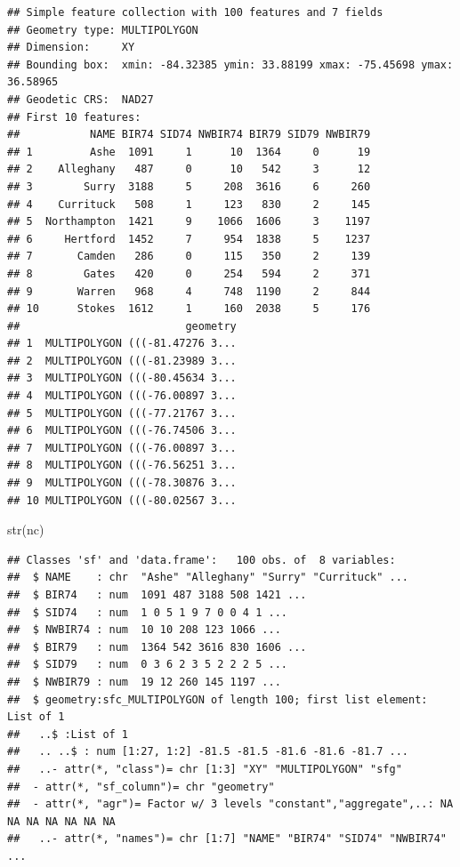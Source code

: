\documentclass[
  spanish,
]{book}
\newenvironment{Shaded}{\begin{snugshade}}{\end{snugshade}}
\newcommand{\FunctionTok}[1]{\textcolor[rgb]{0.00,0.00,0.00}{#1}}
\newcommand{\NormalTok}[1]{#1}
\theoremstyle{break}
\begin{document}
\begin{verbatim}
## Simple feature collection with 100 features and 7 fields
## Geometry type: MULTIPOLYGON
## Dimension:     XY
## Bounding box:  xmin: -84.32385 ymin: 33.88199 xmax: -75.45698 ymax: 36.58965
## Geodetic CRS:  NAD27
## First 10 features:
##           NAME BIR74 SID74 NWBIR74 BIR79 SID79 NWBIR79
## 1         Ashe  1091     1      10  1364     0      19
## 2    Alleghany   487     0      10   542     3      12
## 3        Surry  3188     5     208  3616     6     260
## 4    Currituck   508     1     123   830     2     145
## 5  Northampton  1421     9    1066  1606     3    1197
## 6     Hertford  1452     7     954  1838     5    1237
## 7       Camden   286     0     115   350     2     139
## 8        Gates   420     0     254   594     2     371
## 9       Warren   968     4     748  1190     2     844
## 10      Stokes  1612     1     160  2038     5     176
##                          geometry
## 1  MULTIPOLYGON (((-81.47276 3...
## 2  MULTIPOLYGON (((-81.23989 3...
## 3  MULTIPOLYGON (((-80.45634 3...
## 4  MULTIPOLYGON (((-76.00897 3...
## 5  MULTIPOLYGON (((-77.21767 3...
## 6  MULTIPOLYGON (((-76.74506 3...
## 7  MULTIPOLYGON (((-76.00897 3...
## 8  MULTIPOLYGON (((-76.56251 3...
## 9  MULTIPOLYGON (((-78.30876 3...
## 10 MULTIPOLYGON (((-80.02567 3...
\end{verbatim}

\begin{Shaded}
\begin{Highlighting}[]
\FunctionTok{str}\NormalTok{(nc)}
\end{Highlighting}
\end{Shaded}

\begin{verbatim}
## Classes 'sf' and 'data.frame':   100 obs. of  8 variables:
##  $ NAME    : chr  "Ashe" "Alleghany" "Surry" "Currituck" ...
##  $ BIR74   : num  1091 487 3188 508 1421 ...
##  $ SID74   : num  1 0 5 1 9 7 0 0 4 1 ...
##  $ NWBIR74 : num  10 10 208 123 1066 ...
##  $ BIR79   : num  1364 542 3616 830 1606 ...
##  $ SID79   : num  0 3 6 2 3 5 2 2 2 5 ...
##  $ NWBIR79 : num  19 12 260 145 1197 ...
##  $ geometry:sfc_MULTIPOLYGON of length 100; first list element: List of 1
##   ..$ :List of 1
##   .. ..$ : num [1:27, 1:2] -81.5 -81.5 -81.6 -81.6 -81.7 ...
##   ..- attr(*, "class")= chr [1:3] "XY" "MULTIPOLYGON" "sfg"
##  - attr(*, "sf_column")= chr "geometry"
##  - attr(*, "agr")= Factor w/ 3 levels "constant","aggregate",..: NA NA NA NA NA NA NA
##   ..- attr(*, "names")= chr [1:7] "NAME" "BIR74" "SID74" "NWBIR74" ...
\end{verbatim}
\end{document}
